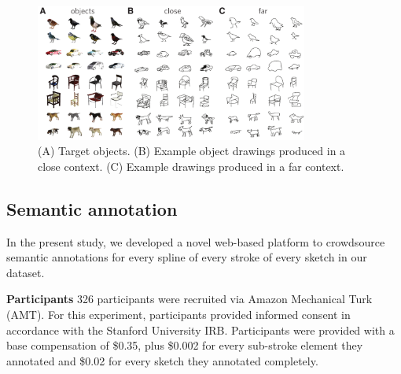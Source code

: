 \documentclass[10pt,letterpaper]{article}
\begin{document}

\begin{figure}
\centering
\includegraphics[width=0.8\textwidth]{figures/refgame_gallery.pdf}
\caption{(A) Target objects. (B) Example object drawings produced in a close context. (C) Example drawings produced in a far context.}
\label{refgame_gallery}
\end{figure}

\subsection{Semantic annotation}

In the present study, we developed a novel web-based platform to crowdsource semantic annotations for every spline of every stroke of every sketch in our dataset. 

\noindent \textbf{Participants} \hspace{3mm} 
326 participants were recruited via Amazon Mechanical Turk (AMT).  
For this experiment, participants provided informed consent in accordance with the Stanford University IRB. 
Participants were provided with a base compensation of \$0.35, plus \$0.002 for every sub-stroke element they annotated and \$0.02 for every sketch they annotated completely. 
\end{document}
